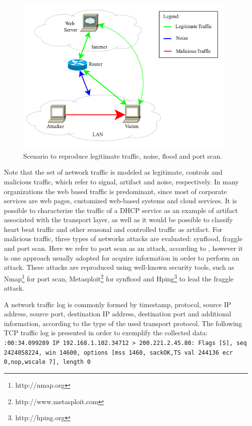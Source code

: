 \begin{figure}[h!]
     \centering 
     \includegraphics[width=11cm]{figs/ch2/fig09.png}
     \caption{Scenario to reproduce legitimate traffic, noise, flood and port scan.}
     \label{fig:2.01}
\end{figure}

Note that the set of network traffic is modeled as legitimate, controls and malicious traffic, which refer to signal, artifact and noise, respectively. In many organizations the web based traffic is predominant, since most of corporate services are  web pages, customized web-based systems and cloud services. It is possible to characterize the traffic of a DHCP service as an example of artifact associated with the transport layer, as well as it would be possible to classify heart beat traffic and other seasonal and controlled traffic as artifact. For malicious traffic, three types of networks attacks are evaluated: synflood, fraggle and port scan. Here we refer to port scan as an attack, according to \cite{ahmed2016survey,moustafa2019holistic}, however it is one approach usually adopted for acquire information in order to perform an attack. These attacks are reproduced using well-known security tools, such as Nmap\footnote{http://nmap.org} for port scan, Metasploit\footnote{http://www.metasploit.com} for synflood and Hping\footnote{http://hping.org} to lead the fraggle attack.

A network traffic log is commonly formed by timestamp, protocol, source IP address, source port, destination IP address, destination port and additional information, according to the type of the used transport protocol. The following TCP traffic log is presented in order to exemplify the collected data:
\newline
\newline
\texttt{:00:34.099289 IP 192.168.1.102.34712 > 200.221.2.45.80: Flags [S], seq 2424058224, win 14600, options [mss 1460, sackOK,TS val 244136 ecr 0,nop,wscale 7], length 0}
\newline

